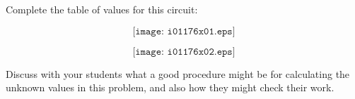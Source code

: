 

Complete the table of values for this circuit:

$$\texttt{[image: i01176x01.eps]}$$







$$\texttt{[image: i01176x02.eps]}$$







Discuss with your students what a good procedure might be for calculating the unknown values in this problem, and also how they might check their work.




